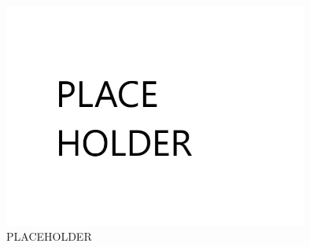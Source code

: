 \documentclass[12pt]{report}
\begin{document}
\begin{figure}[h!]
    \centering
    \includegraphics[width=100mm]{Figures/Chapter4/PLACEHOLDER.jpg} 
    \caption{PLACEHOLDER}
    \label{fig:python_stm_diagram}    
\end{figure}
\end{document}
